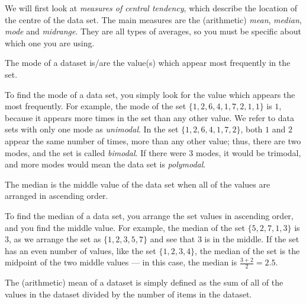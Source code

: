 We will first look at \textit{measures of central tendency}, which describe the location of the centre of the data set. The main measures are the (arithmetic) \textit{mean}, \textit{median}, \textit{mode} and \textit{midrange}. They are all types of averages, so you must be specific about which one you are using.

\begin{tcolorbox}
    \begin{definition}[Mode]
        The mode of a dataset is/are the value(s) which appear most frequently in the set. 
    \end{definition}
\end{tcolorbox}

To find the mode of a data set, you simply look for the value which appears the most frequently. For example, the mode of the set $\{ 1,2,6,4,1,7,2,1,1 \}$ is $1$, because it appears more times in the set than any other value. We refer to data sets with only one mode as \textit{unimodal}. In the set $\{ 1,2,6,4,1,7,2 \}$, both $1$ and $2$ appear the same number of times, more than any other value; thus, there are two modes, and the set is called \textit{bimodal}. If there were 3 modes, it would be trimodal, and more modes would mean the data set is \textit{polymodal}.

\begin{tcolorbox}
    \begin{definition}[Median]
        The median is the middle value of the data set when all of the values are arranged in ascending order.
    \end{definition}
\end{tcolorbox}

To find the median of a data set, you arrange the set values in ascending order, and you find the middle value. For example, the median of the set $\{ 5,2,7,1,3 \}$ is $3$, as we arrange the set as $\{ 1,2,3,5,7 \}$ and see that $3$ is in the middle. If the set has an even number of values, like the set $\{1,2,3,4\}$, the median of the set is the midpoint of the two middle values — in this case, the median is $\frac{3+2}{2}=2.5$.

\begin{tcolorbox}
    \begin{definition}[Mean]
        The (arithmetic) mean of a dataset is simply defined as the sum of all of the values in the dataset divided by the number of items in the dataset.
    \end{definition}
\end{tcolorbox}

